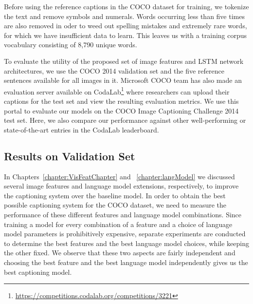 Before using the reference captions in the COCO dataset for training, we
tokenize the text and remove symbols and numerals.
Words occurring less than five times are also removed in oder to weed out spelling
mistakes and extremely rare words, for which we have insufficient data to learn.
This leaves us with a training corpus vocabulary consisting of 8,790 unique words. 

To evaluate the utility of the proposed set of image features and LSTM network
architectures, we use the COCO 2014 validation set and the five reference
sentences available for all images in it.
Microsoft COCO team has also made an evaluation server available on
CodaLab\footnote{\url{https://competitions.codalab.org/competitions/3221}} where
researchers can upload their captions for the test set and view the resulting
evaluation metrics.
We use this portal to evaluate our models on the COCO Image Captioning Challenge
2014 test set. 
Here, we also compare our performance against other well-performing or
state-of-the-art entries in the CodaLab leaderboard.

\subsection{Results on Validation Set}
In Chapters~\ref{chapter:VisFeatChapter} and ~\ref{chapter:langModel} we
discussed several image features and language model extensions, respectively, to
improve the captioning system over the baseline model.
In order to obtain the best possible captioning system for the COCO dataset, we
need to measure the performance of these different features and language model
combinations.
Since training a model for every combination of a feature and a choice of
language model parameters is prohibitively expensive, separate experiments are
conducted to determine the best features and the best language model choices,
while keeping the other fixed.
We observe that these two aspects are fairly independent and choosing the best
feature and the best language model independently  gives us the best captioning
model.
